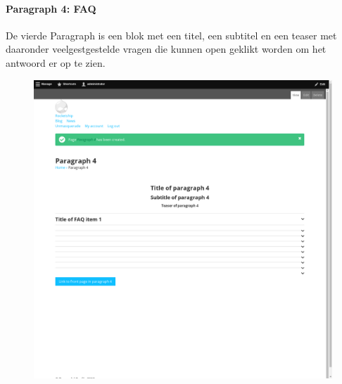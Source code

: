 \paragraph{Paragraph 4: FAQ}
De vierde Paragraph is een blok met een titel, een subtitel en een teaser met daaronder veelgestgestelde vragen die kunnen open geklikt worden om het antwoord er op te zien.
\begin{figure}[h]
\includegraphics[width=1\textwidth]{img/p004.png}
\end{figure}

\clearpage

